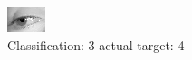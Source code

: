 \begin{figure}[h!]
\begin{center}
\includegraphics[width=0.60\columnwidth]{figures/ID2970_class_3_target_4.png}
\end{center}
\caption{ Classification: 3 actual target: 4}
\label{fig:ID2970_class_3_target_4}
\end{figure}
